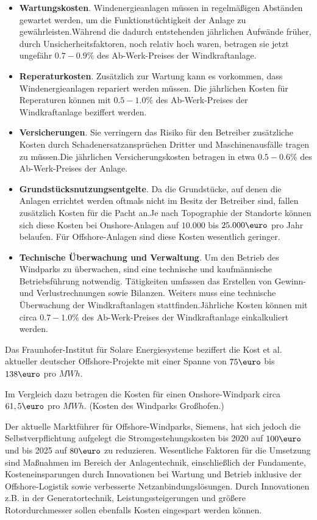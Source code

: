 \documentclass[a4paper,12pt]{article}
\begin{document}
	\begin{itemize}
		\item \textbf{Wartungskosten}. Windenergieanlagen müssen in regelmäßigen Abständen gewartet werden, um die Funktionstüchtigkeit der Anlage zu gewährleisten.\newline Während die dadurch entstehenden jährlichen Aufwände früher, durch Unsicherheitsfaktoren, noch relativ hoch waren, betragen sie jetzt ungefähr $0.7 - 0.9\%$ des Ab-Werk-Preises der Windkraftanlage.
		\item \textbf{Reperaturkosten}. Zusätzlich zur Wartung kann es vorkommen, dass Windenergieanlagen repariert werden müssen.\newline
		Die jährlichen Kosten für Reperaturen können mit $0.5 - 1.0\%$ des Ab-Werk-Preises der Windkraftanlage beziffert werden.
		\item \textbf{Versicherungen}. Sie verringern das Risiko für den Betreiber zusätzliche Kosten durch Schadenersatzansprüchen Dritter und Maschinenausfälle tragen zu müssen.\newline Die jährlichen Versicherungskosten betragen in etwa $0.5 - 0.6\%$ des Ab-Werk-Preises der Anlage.
		\item \textbf{Grundstücksnutzungsentgelte}. Da die Grundstücke, auf denen die Anlagen errichtet werden oftmals nicht im Besitz der Betreiber sind, fallen zusätzlich Kosten für die Pacht an.\newline Je nach Topographie der Standorte können sich diese Kosten bei Onshore-Anlagen auf $10.000$ bis $25.000\mbox{\euro}$ pro Jahr belaufen. Für Offshore-Anlagen sind diese Kosten wesentlich geringer.
		\item \textbf{Technische Überwachung und Verwaltung}. Um den Betrieb des Windparks zu überwachen, sind eine technische und kaufmännische Betriebsführung notwendig. Tätigkeiten umfassen das Erstellen von Gewinn- und Verlustrechnungen sowie Bilanzen. Weiters muss eine technische Überwachung der Windkraftanlagen stattfinden.\newline Jährliche Kosten können mit circa $0.7 - 1.0\%$ des Ab-Werk-Preises der Windkraftanlage einkalkuliert werden.
	\end{itemize}
	Das Fraunhofer-Institut für Solare Energiesysteme beziffert die Kost et al. aktueller deutscher Offshore-Projekte mit einer Spanne von $75\mbox{\euro}$ bis $138\mbox{\euro}$ pro $MWh$.\\ \par
	\noindent Im Vergleich dazu betragen die Kosten für einen Onshore-Windpark circa $61,5\mbox{\euro}$ pro $MWh$. (Kosten des Windparks Großhofen.)\\ \par
	\noindent Der aktuelle Marktführer für Offshore-Windparks, Siemens, hat sich jedoch die Selbstverpflichtung aufgelegt die Stromgestehungskosten bis 2020 auf $100\mbox{\euro}$ und bis 2025 auf $80\mbox{\euro}$ zu reduzieren. Wesentliche Faktoren für die Umsetzung sind Maßnahmen im Bereich der Anlagentechnik, einschließlich der Fundamente, Kosteneinsparungen durch Innovationen bei Wartung und Betrieb inklusive der Offshore-Logistik sowie verbesserte Netzanbindungslösungen. Durch Innovationen z.B. in der Generatortechnik, Leistungssteigerungen und größere Rotordurchmesser sollen ebenfalls Kosten eingespart werden können.
\end{document}
